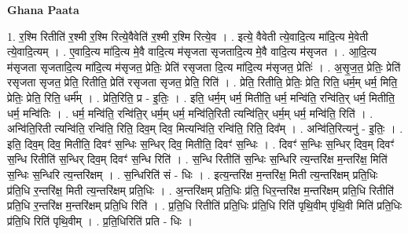 \documentclass[17pt]{extarticle}
\begin{document}
\textbf{Ghana Paata } \newline

1. र॒श्मि रितीति॑ र॒श्मी र॒श्मि रित्ये॒वैवेति॑ र॒श्मी र॒श्मि रित्ये॒व । . इत्ये॒ वैवेती त्ये॒वादि॒त्य मा॑दि॒त्य मे॒वेती त्ये॒वादि॒त्यम् । . ए॒वादि॒त्य मा॑दि॒त्य मे॒वै वादि॒त्य म॑सृजता सृजतादि॒त्य मे॒वै वादि॒त्य म॑सृजत । . आ॒दि॒त्य म॑सृजता सृजतादि॒त्य मा॑दि॒त्य म॑सृजत॒ प्रेतिः॒ प्रेति॑ रसृजता दि॒त्य मा॑दि॒त्य म॑सृजत॒ प्रेतिः॑ । . अ॒सृ॒ज॒त॒ प्रेतिः॒ प्रेति॑ रसृजता सृजत॒ प्रेति॒ रितीति॒ प्रेति॑ रसृजता सृजत॒ प्रेति॒ रिति॑ । . प्रेति॒ रितीति॒ प्रेतिः॒ प्रेति॒ रिति॒ धर्म॒म् धर्म॒ मिति॒ प्रेतिः॒ प्रेति॒ रिति॒ धर्म᳚म् । . प्रेति॒रिति॒ प्र - इ॒तिः॒ । . इति॒ धर्म॒म् धर्म॒ मितीति॒ धर्म॒ मन्वि॑ति॒ रन्वि॑ति॒र् धर्म॒ मितीति॒ धर्म॒ मन्वि॑तिः । . धर्म॒ मन्वि॑ति॒ रन्वि॑ति॒र् धर्म॒म् धर्म॒ मन्वि॑ति॒रिती त्यन्वि॑ति॒र् धर्म॒म् धर्म॒ मन्वि॑ति॒ रिति॑ । . अन्वि॑ति॒रिती त्यन्वि॑ति॒ रन्वि॑ति॒ रिति॒ दिव॒म् दिव॒ मित्यन्वि॑ति॒ रन्वि॑ति॒ रिति॒ दिव᳚म् । . अन्वि॑ति॒रित्यनु॑ - इ॒तिः॒ । . इति॒ दिव॒म् दिव॒ मितीति॒ दिवꣳ॑ स॒न्धिः स॒न्धिर् दिव॒ मितीति॒ दिवꣳ॑ स॒न्धिः । . दिवꣳ॑ स॒न्धिः स॒न्धिर् दिव॒म् दिवꣳ॑ स॒न्धि रितीति॑ स॒न्धिर् दिव॒म् दिवꣳ॑ स॒न्धि रिति॑ । . स॒न्धि रितीति॑ स॒न्धिः स॒न्धिरि त्य॒न्तरि॑क्ष म॒न्तरि॑क्ष॒ मिति॑ स॒न्धिः स॒न्धिरि त्य॒न्तरि॑क्षम् । . स॒न्धिरिति॑ सं - धिः । . इत्य॒न्तरि॑क्ष म॒न्तरि॑क्ष॒ मिती त्य॒न्तरि॑क्षम् प्रति॒धिः प्र॑ति॒धि र॒न्तरि॑क्ष॒ मिती त्य॒न्तरि॑क्षम् प्रति॒धिः । . अ॒न्तरि॑क्षम् प्रति॒धिः प्र॑ति॒ धिर॒न्तरि॑क्ष म॒न्तरि॑क्षम् प्रति॒धि रितीति॑ प्रति॒धि र॒न्तरि॑क्ष म॒न्तरि॑क्षम् प्रति॒धि रिति॑ । . प्र॒ति॒धि रितीति॑ प्रति॒धिः प्र॑ति॒धि रिति॑ पृथि॒वीम् पृ॑थि॒वी मिति॑ प्रति॒धिः प्र॑ति॒धि रिति॑ पृथि॒वीम् । . प्र॒ति॒धिरिति॑ प्रति - धिः । \newline
\end{document}
